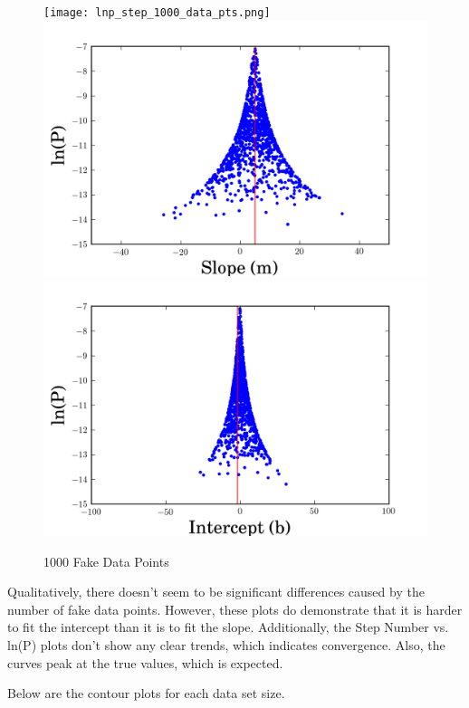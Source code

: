 \documentclass[english,12pt]{article}
\begin{document}
\begin{figure}[H]
\caption{1000 Fake Data Points}
  \texttt{[image: lnp\_step\_1000\_data\_pts.png]}
\endminipage\hfill
{}
  \includegraphics[width=\linewidth]{lnp_m_1000_data_points.png}
\endminipage\hfill
{}%
  \includegraphics[width=\linewidth]{lnp_b_1000_data_points.png}
\endminipage\hfill
\end{figure}

Qualitatively, there doesn't seem to be significant differences caused by the number of fake data points. However, these plots do demonstrate that it is harder to fit the intercept than it is to fit the slope. Additionally, the Step Number vs. ln(P) plots don't show any clear trends, which indicates convergence. Also, the curves peak at the true values, which is expected.

Below are the contour plots for each data set size.
\end{document}
